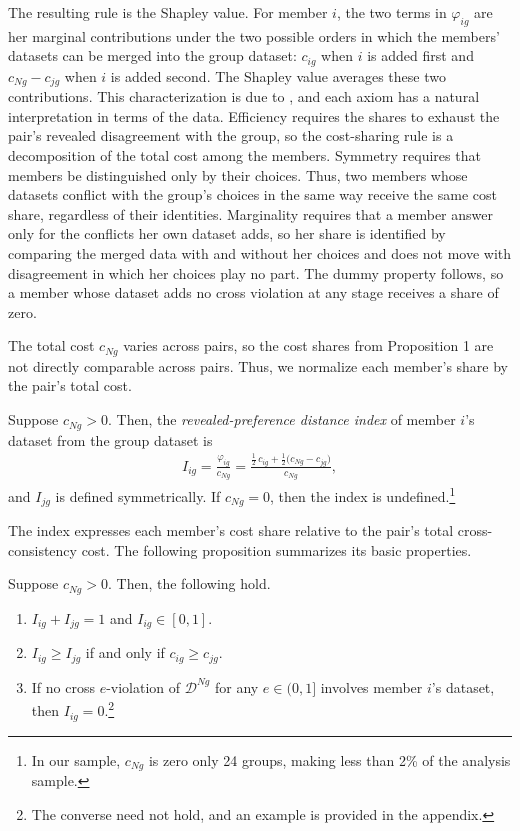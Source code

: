 \documentclass[11 pt]{article}
\begin{document}
The resulting rule is the Shapley value. For member $i$, the two terms in $\varphi_{ig}$ are her marginal contributions under the two possible orders in which the members' datasets can be merged into the group dataset: $c_{ig}$ when $i$ is added first and $c_{Ng} - c_{jg}$ when $i$ is added second. The Shapley value averages these two contributions. This characterization is due to \citet{young1985monotonic}, and each axiom has a natural interpretation in terms of the data. Efficiency requires the shares to exhaust the pair's revealed disagreement with the group, so the cost-sharing rule is a decomposition of the total cost among the members. Symmetry requires that members be distinguished only by their choices. Thus, two members whose datasets conflict with the group's choices in the same way receive the same cost share, regardless of their identities. Marginality requires that a member answer only for the conflicts her own dataset adds, so her share is identified by comparing the merged data with and without her choices and does not move with disagreement in which her choices play no part. The dummy property follows, so a member whose dataset adds no cross violation at any stage receives a share of zero.

The total cost $c_{Ng}$ varies across pairs, so the cost shares from Proposition 1 are not directly comparable across pairs. Thus, we normalize each member’s share by the pair’s total cost.

\begin{definition}\label{def:index}\normalfont
Suppose $c_{Ng} > 0$. Then, the \emph{revealed-preference distance index} of member $i$'s dataset from the group dataset is
\begin{align}\label{eqn:I_ig}
I_{ig} = \frac{\varphi_{ig}}{c_{Ng}} = \frac{\tfrac{1}{2}\, c_{ig} + \tfrac{1}{2}\bigl( c_{Ng} - c_{jg} \bigr)}{c_{Ng}},
\end{align}
and $I_{jg}$ is defined symmetrically. If $c_{Ng} = 0$, then the index is undefined.\footnote{In our sample, $c_{Ng}$ is zero only 24 groups, making less than 2\% of the analysis sample.
}
\end{definition}

The index expresses each member's cost share relative to the pair's total cross-consistency cost. The following proposition summarizes its basic properties.

\begin{proposition}\label{prop:properties}
Suppose $c_{Ng} > 0$. Then, the following hold.
\begin{enumerate}
\item[(i)] $I_{ig} + I_{jg} = 1$ and $I_{ig} \in [0,1]$.
\item[(ii)] $I_{ig} \geq I_{jg}$ if and only if $c_{ig} \geq c_{jg}$.
\item[(iii)] If no cross $e$-violation of $\mathcal{D}^{Ng}$ for any $e \in (0,1]$ involves member $i$'s dataset, then $I_{ig} = 0$.\footnote{The converse need not hold, and an example is provided in the appendix.}
\end{enumerate}
\end{proposition}
\end{document}
